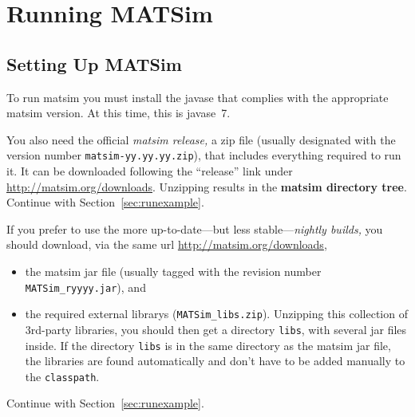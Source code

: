 
\section{Running MATSim}
\label{sec:runningmatsim}

\subsection{Setting Up MATSim}
\label{sec:settingUpMatsim}

To run \gls{matsim} you must install the \gls{javase} that complies with the appropriate \gls{matsim} version. At this time, this is \gls{javase}~7.

You also need the official \emph{\gls{matsim} release,} a zip file (usually designated with the version number \lstinline|matsim-yy.yy.yy.zip|), that includes everything required to run it. It can be downloaded following the ``release'' link under \url{http://matsim.org/downloads}.
Unzipping results in the \textbf{\gls{matsim} directory tree}. Continue with Section~\ref{sec:runexample}.

If you prefer to use the more up-to-date---but less stable---\emph{nightly builds,} you should download, via the same \gls{url} \url{http://matsim.org/downloads},
\begin{itemize}\styleItemize
\item the \gls{matsim} \gls{jar} file (usually tagged with the revision number \lstinline|MATSim_ryyyy.jar|), and
\item the required external \glspl{library} (\lstinline|MATSim_libs.zip|). 
Unzipping this collection of 3rd-party libraries, you should then get a directory \lstinline|libs|, with several \gls{jar} files inside. If the directory \lstinline|libs| is in the same directory as the \gls{matsim} \gls{jar} file, the libraries are found automatically and don't have to be added manually to the \lstinline|classpath|.
\end{itemize}
Continue with Section~\ref{sec:runexample}.

